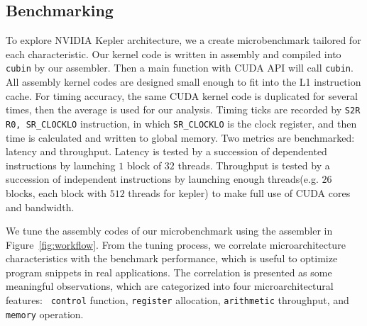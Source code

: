 \subsection{Benchmarking} %
\label{sec:benchmark}


To explore NVIDIA Kepler architecture, we a create microbenchmark tailored for each characteristic.
Our kernel code is  written in assembly and compiled into {\tt cubin} by our assembler. Then a main function with CUDA API 
will call {\tt cubin}.
All assembly kernel codes are designed small enough to fit into the L1 instruction cache.
For timing accuracy, the same CUDA kernel code is duplicated for several times, then the average is used for our analysis.
Timing ticks are recorded by {\tt S2R R0, SR\_CLOCKLO} instruction, in which {\tt SR\_CLOCKLO} is the clock register,  
and then time is calculated and written to global memory.
Two metrics are benchmarked: latency and throughput. Latency is tested by a succession of dependented instructions by
launching $1$ block of $32$ threads. Throughput is tested by a succession of independent instructions by launching enough
threads(e.g. $26$ blocks, each block with $512$ threads for kepler) to make full use of CUDA cores and bandwidth.

We tune the assembly codes of our microbenchmark using the assembler in Figure~\ref{fig:workflow}.
From the tuning process, we correlate microarchitecture characteristics with the benchmark performance, which is useful
to optimize program snippets in real applications.
The correlation is presented as some meaningful observations, which are categorized into four microarchitectural features:  {\tt 
control} function, {\tt register} allocation, {\tt arithmetic} throughput, and {\tt memory} operation.


